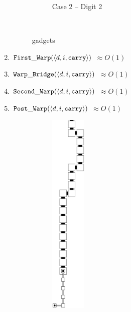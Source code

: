 \begin{enumerate}[label={--}]
\begin{figure}[H]
\begin{subfigure}[t]{0.2\textwidth}
                        \caption{\label{fig:warping/pre_warp_case2_digit2_msr} Case 2 -- Digit 2}
                    \end{subfigure}%
                    ~
                    \caption{\label{fig:pre_warp_gadgets} {\prewarp} gadgets }
                \end{figure}


            \item ${\tt First\_Warp} (\langle d, i, {\tt carry}\rangle)$ $\approx O(1)$

            \item ${\tt Warp\_Bridge}(\langle d, i, {\tt carry}\rangle)$ $\approx O(1)$

            \item ${\tt Second\_Warp}(\langle d, i, {\tt carry}\rangle)$ $\approx O(1)$

            \item ${\tt Post\_Warp}  (\langle d, i, {\tt carry}\rangle)$ $\approx O(1)$
                \begin{figure}[H]
                    \begin{subfigure}[t]{0.2\textwidth}
                        \centering
                        \includegraphics[width=0.2\textwidth]{warping/post_warp_general_digit1}

\end{subfigure}
\end{figure}
\end{enumerate}
